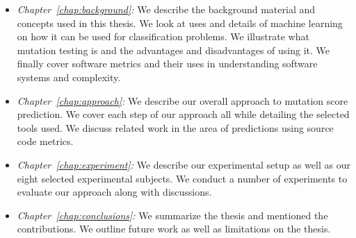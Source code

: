 \begin{itemize}
  \item \emph{Chapter~\ref{chap:background}:} We describe the background material and concepts used in this thesis. We look at uses and details of machine learning on how it can be used for classification problems. We illustrate what mutation testing is and  the advantages and disadvantages of using it. We finally cover software metrics and their uses in understanding software systems and complexity.
  \item \emph{Chapter~\ref{chap:approach}:} We describe our overall approach to mutation score prediction. We cover each step of our approach all while detailing the selected tools used. We discuss related work in the area of predictions using source code metrics.
  \item \emph{Chapter~\ref{chap:experiment}:} We describe our experimental setup as well as our eight selected experimental subjects. We conduct a number of experiments to evaluate our approach along with discussions.
  \item \emph{Chapter~\ref{chap:conclusions}:} We summarize the thesis and mentioned the contributions. We outline future work as well as limitations on the thesis.
\end{itemize}
